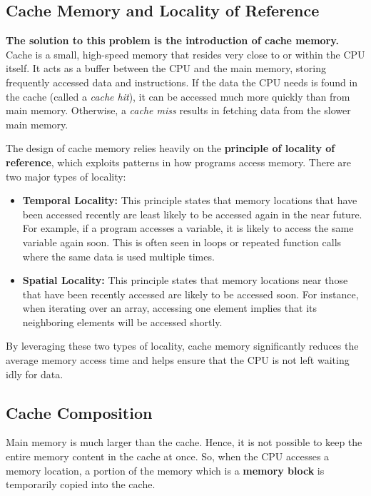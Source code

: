 \documentclass[12pt]{book}
\begin{document}
\subsection{Cache Memory and Locality of Reference}
\textbf{The solution to this problem is the introduction of cache memory.} Cache is a small, high-speed memory that resides very close to or within the CPU itself. It acts as a buffer between the CPU and the main memory, storing frequently accessed data and instructions. If the data the CPU needs is found in the cache (called a \textit{cache hit}), it can be accessed much more quickly than from main memory. Otherwise, a \textit{cache miss} results in fetching data from the slower main memory.

The design of cache memory relies heavily on the \textbf{principle of locality of reference}, which exploits patterns in how programs access memory. There are two major types of locality:

\begin{itemize}
    \item \textbf{Temporal Locality:} This principle states that memory locations that have been accessed recently are least likely to be accessed again in the near future. For example, if a program accesses a variable, it is likely to access the same variable again soon. This is often seen in loops or repeated function calls where the same data is used multiple times.
    
    \item \textbf{Spatial Locality:} This principle states that memory locations near those that have been recently accessed are likely to be accessed soon. For instance, when iterating over an array, accessing one element implies that its neighboring elements will be accessed shortly.
\end{itemize}

By leveraging these two types of locality, cache memory significantly reduces the average memory access time and helps ensure that the CPU is not left waiting idly for data.


\subsection{Cache Composition}

Main memory is much larger than the cache. Hence, it is not possible to keep the entire memory content in the cache at once. So, when the CPU accesses a memory location, a portion of the memory which is a \textbf{memory block} is temporarily copied into the cache.
\end{document}

